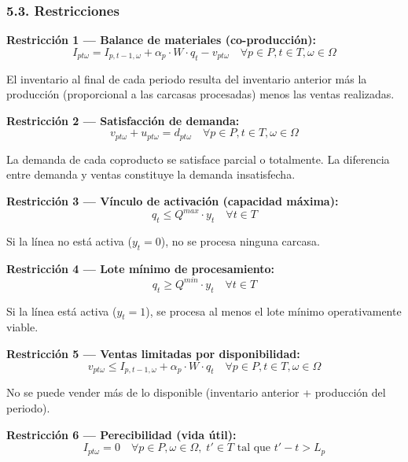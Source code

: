 \documentclass[
  spanish,
  12pt,
]{article}
\begin{document}
\subsubsection{5.3. Restricciones}\label{restricciones}

\textbf{Restricción 1 --- Balance de materiales (co-producción):}
\begin{equation}
I_{pt\omega} = I_{p,t-1,\omega} + \alpha_p \cdot W \cdot q_t - v_{pt\omega} \quad \forall p \in P, t \in T, \omega \in \Omega
\end{equation}

El inventario al final de cada periodo resulta del inventario anterior
más la producción (proporcional a las carcasas procesadas) menos las
ventas realizadas.

\textbf{Restricción 2 --- Satisfacción de demanda:} \begin{equation}
v_{pt\omega} + u_{pt\omega} = d_{pt\omega} \quad \forall p \in P, t \in T, \omega \in \Omega
\end{equation}

La demanda de cada coproducto se satisface parcial o totalmente. La
diferencia entre demanda y ventas constituye la demanda insatisfecha.

\textbf{Restricción 3 --- Vínculo de activación (capacidad máxima):}
\begin{equation}
q_t \leq Q^{max} \cdot y_t \quad \forall t \in T
\end{equation}

Si la línea no está activa (\(y_t = 0\)), no se procesa ninguna carcasa.

\textbf{Restricción 4 --- Lote mínimo de procesamiento:}
\begin{equation}
q_t \geq Q^{min} \cdot y_t \quad \forall t \in T
\end{equation}

Si la línea está activa (\(y_t = 1\)), se procesa al menos el lote
mínimo operativamente viable.

\textbf{Restricción 5 --- Ventas limitadas por disponibilidad:}
\begin{equation}
v_{pt\omega} \leq I_{p,t-1,\omega} + \alpha_p \cdot W \cdot q_t \quad \forall p \in P, t \in T, \omega \in \Omega
\end{equation}

No se puede vender más de lo disponible (inventario anterior +
producción del periodo).

\textbf{Restricción 6 --- Perecibilidad (vida útil):} \begin{equation}
I_{pt\omega} = 0 \quad \forall p \in P, \omega \in \Omega, \; t' \in T \text{ tal que } t' - t > L_p
\end{equation}
\end{document}
